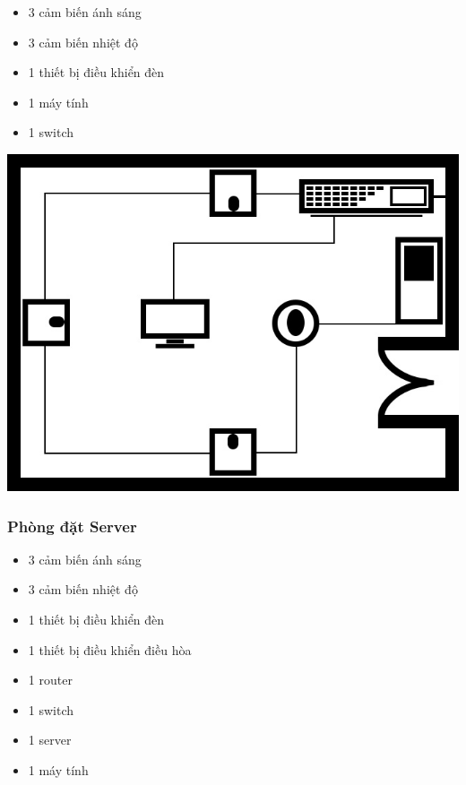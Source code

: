 \documentclass[12pt]{report}
\begin{document}
			\begin{itemize}
				\item 3 cảm biến ánh sáng
				\item 3 cảm biến nhiệt độ
				\item 1 thiết bị điều khiển đèn
				\item 1 máy tính
				\item 1 switch
			\end{itemize}
		
			\begin{center}
				\includegraphics[scale=0.3]{roomSmall.jpg} \\
			\end{center}
		
		\newpage
		\subsubsection{Phòng đặt Server}
		
			\begin{itemize}
				\item 3 cảm biến ánh sáng
				\item 3 cảm biến nhiệt độ
				\item 1 thiết bị điều khiển đèn
				\item 1 thiết bị điều khiển điều hòa
				\item 1 router
				\item 1 switch
				\item 1 server
				\item 1 máy tính
			\end{itemize}
			
\end{document}
